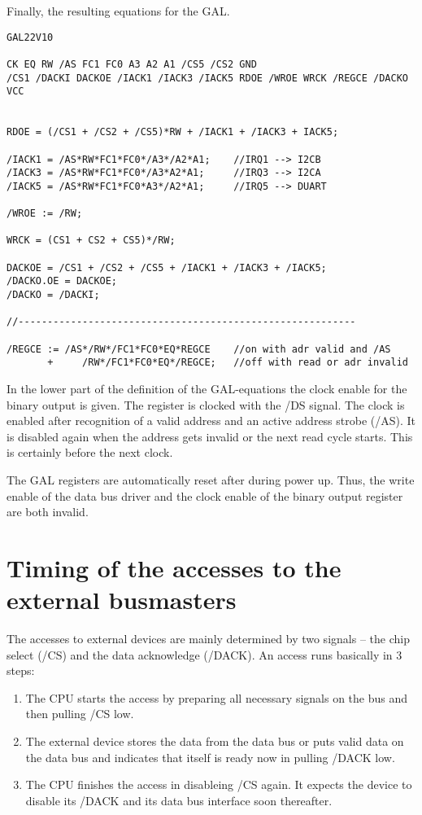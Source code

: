 \documentclass[12pt]{article}
\newcommand{\be}{\begin{enumerate}}
\newcommand{\ee}{\end{enumerate}}
\begin{document}
Finally, the resulting equations for the GAL.

\small
\begin{verbatim}
GAL22V10

CK EQ RW /AS FC1 FC0 A3 A2 A1 /CS5 /CS2 GND
/CS1 /DACKI DACKOE /IACK1 /IACK3 /IACK5 RDOE /WROE WRCK /REGCE /DACKO VCC


RDOE = (/CS1 + /CS2 + /CS5)*RW + /IACK1 + /IACK3 + IACK5;

/IACK1 = /AS*RW*FC1*FC0*/A3*/A2*A1;    //IRQ1 --> I2CB
/IACK3 = /AS*RW*FC1*FC0*/A3*A2*A1;     //IRQ3 --> I2CA
/IACK5 = /AS*RW*FC1*FC0*A3*/A2*A1;     //IRQ5 --> DUART

/WROE := /RW;

WRCK = (CS1 + CS2 + CS5)*/RW;

DACKOE = /CS1 + /CS2 + /CS5 + /IACK1 + /IACK3 + /IACK5;
/DACKO.OE = DACKOE;
/DACKO = /DACKI;

//----------------------------------------------------------

/REGCE := /AS*/RW*/FC1*FC0*EQ*REGCE    //on with adr valid and /AS
       +     /RW*/FC1*FC0*EQ*/REGCE;   //off with read or adr invalid
\end{verbatim}
\normalsize

In the lower part of the definition of the GAL-equations the clock enable
for the binary output is given. The register is clocked with the /DS signal.
The clock is enabled after recognition of a valid address and an active
address strobe (/AS). It is disabled again when the address gets invalid or
the next read cycle starts. This is certainly before the next clock.

The GAL registers are automatically reset after during power up. Thus, the
write enable of the data bus driver and the clock enable of the binary
output register are both invalid.


\section{Timing of the accesses to the external busmasters}

The accesses to external devices are mainly determined by two signals
-- the chip select (/CS) and the data acknowledge (/DACK). An access
runs basically in 3 steps:

\be
\item The CPU starts the access by preparing all necessary signals on
  the bus and then pulling /CS low.
\item The external device stores the data from the data bus or puts
  valid data on the data bus and indicates that itself is ready now in
  pulling /DACK low.
\item The CPU finishes the access in disableing /CS again. It expects
  the device to disable its /DACK and its data bus interface soon
  thereafter.
\ee
\end{document}
